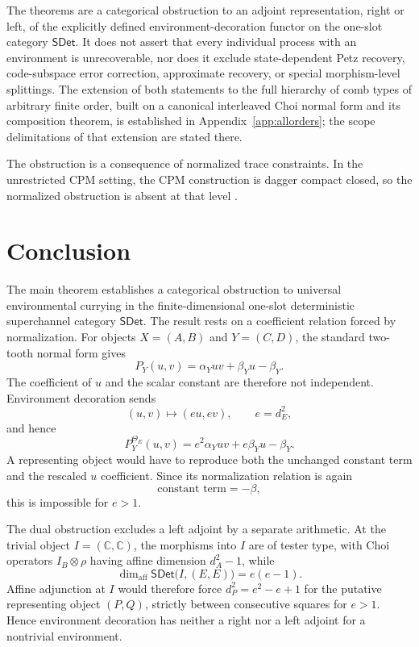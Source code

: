 \documentclass[11pt,a4paper]{article}
\theoremstyle{definition}
\theoremstyle{plain}
\theoremstyle{remark}
\newcommand{\affdim}{\dim_{\mathrm{aff}}}
\newcommand{\SDet}{\mathsf{SDet}}
\begin{document}
The theorems are a categorical obstruction to an adjoint representation, right or left, of the explicitly defined environment-decoration functor on the one-slot category $\SDet$. It does not assert that every individual process with an environment is unrecoverable, nor does it exclude state-dependent Petz recovery, code-subspace error correction, approximate recovery, or special morphism-level splittings. The extension of both statements to the full hierarchy of comb types of arbitrary finite order, built on a canonical interleaved Choi normal form and its composition theorem, is established in Appendix~\ref{app:allorders}; the scope delimitations of that extension are stated there.

The obstruction is a consequence of normalized trace constraints. In the unrestricted CPM setting, the CPM construction is dagger compact closed, so the normalized obstruction is absent at that level \cite{selinger2007}.

\section{Conclusion}

The main theorem establishes a categorical obstruction to universal
environmental currying in the finite-dimensional one-slot deterministic
superchannel category $\SDet$. The result rests on a coefficient relation
forced by normalization. For objects $X=(A,B)$ and $Y=(C,D)$, the standard two-tooth
normal form gives
\[
P_Y(u,v)=\alpha_Yuv+\beta_Yu-\beta_Y.
\]
The coefficient of $u$ and the scalar constant are therefore not
independent. Environment decoration sends
\[
(u,v)\longmapsto(eu,ev),\qquad e=d_E^2,
\]
and hence
\[
P_Y^{\Theta_E}(u,v)=e^2\alpha_Yuv+e\beta_Yu-\beta_Y.
\]
A representing object would have to reproduce both the unchanged
constant term and the rescaled $u$ coefficient. Since its normalization relation is again
\[
\text{constant term}=-\beta,
\]
this is impossible for $e>1$.

The dual obstruction excludes a left adjoint by a separate arithmetic.
At the trivial object $I=(\mathbb C,\mathbb C)$, the morphisms into $I$
are of tester type, with Choi operators $I_B\otimes\rho$ having affine
dimension $d_A^2-1$, while
\[
\affdim\SDet\bigl(I,(E,E)\bigr)=e(e-1).
\]
Affine adjunction at $I$ would therefore force $d_P^2=e^2-e+1$ for the
putative representing object $(P,Q)$, strictly between consecutive
squares for $e>1$. Hence environment decoration has neither a right nor
a left adjoint for a nontrivial environment.
\end{document}
